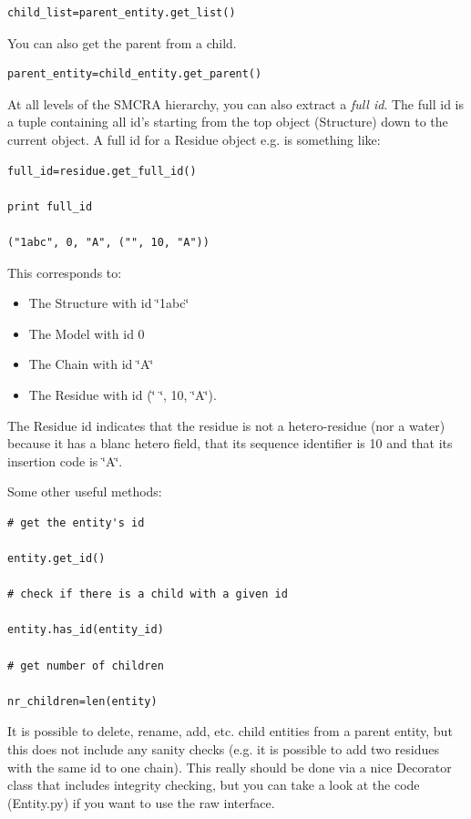 \documentclass{report}
\begin{document}
\begin{verbatim}
child_list=parent_entity.get_list()
\end{verbatim}

You can also get the parent from a child.

\begin{verbatim}
parent_entity=child_entity.get_parent()
\end{verbatim}

At all levels of the SMCRA hierarchy, you can also extract a \emph{full id}.
The full id is a tuple containing all id's starting from the top object (Structure)
down to the current object. A full id for a Residue object e.g. is something
like: 

\begin{verbatim}
full_id=residue.get_full_id()

print full_id

("1abc", 0, "A", ("", 10, "A"))
\end{verbatim}

This corresponds to: 

\begin{itemize}
\item The Structure with id \char`\"{}1abc\char`\"{}
\item The Model with id 0 
\item The Chain with id \char`\"{}A\char`\"{}
\item The Residue with id (\char`\"{} \char`\"{}, 10, \char`\"{}A\char`\"{}). 
\end{itemize}
The Residue id indicates that the residue is not a hetero-residue (nor a water)
because it has a blanc hetero field, that its sequence identifier is 10 and
that its insertion code is \char`\"{}A\char`\"{}.

Some other useful methods:

\begin{verbatim}
# get the entity's id

entity.get_id()

# check if there is a child with a given id

entity.has_id(entity_id)

# get number of children

nr_children=len(entity)
\end{verbatim}

It is possible to delete, rename, add, etc. child entities from a parent entity,
but this does not include any sanity checks (e.g. it is possible to add two
residues with the same id to one chain). This really should be done via a nice
Decorator class that includes integrity checking, but you can take a look at
the code (Entity.py) if you want to use the raw interface. 
\end{document}

